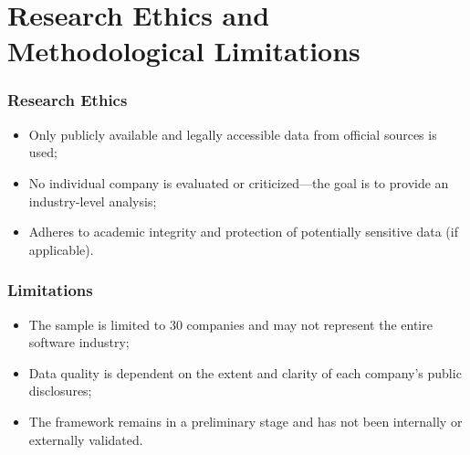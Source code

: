 \section{Research Ethics and Methodological Limitations}
\subsubsection{Research Ethics}
\begin{itemize}
    \item Only publicly available and legally accessible data from official sources is used;
    \item No individual company is evaluated or criticized---the goal is to provide an industry-level analysis;
    \item Adheres to academic integrity and protection of potentially sensitive data (if applicable).
\end{itemize}

\subsubsection{Limitations}
\begin{itemize}
    \item The sample is limited to 30 companies and may not represent the entire software industry;
    \item Data quality is dependent on the extent and clarity of each company's public disclosures;
    \item The framework remains in a preliminary stage and has not been internally or externally validated.
\end{itemize}